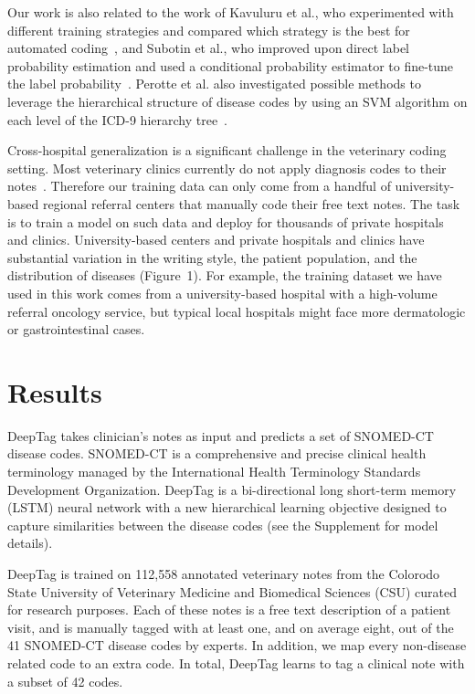 \documentclass{article}[11pt,oneside]
\begin{document}
Our work is also related to the work of Kavuluru et al., who experimented with different training strategies and compared which strategy is the best for automated coding~\cite{kavuluru2015empirical}, and Subotin et al., who improved upon direct label probability estimation and used a conditional probability estimator to fine-tune the label probability~\cite{subotin2016method}. Perotte et al. also investigated possible methods to leverage the hierarchical structure of disease codes by using an SVM algorithm on each level of the ICD-9 hierarchy tree~\cite{perotte2013diagnosis}.

Cross-hospital generalization is a significant challenge in the veterinary coding setting. Most veterinary clinics currently do not apply diagnosis codes to their notes~\cite{o2014approaches}. Therefore our training data can only come from a handful of university-based regional referral centers that manually code their free text notes. The task is to train a model on such data and deploy for thousands of private hospitals and clinics. University-based centers and private hospitals and clinics have substantial variation in the writing style, the patient population, and the distribution of diseases (Figure~1). For example, the training dataset we have used in this work comes from a university-based hospital with a high-volume referral oncology service, but typical local hospitals might face more dermatologic or gastrointestinal cases.

\section*{Results}

DeepTag takes clinician's notes as input and predicts a set of SNOMED-CT disease codes. SNOMED-CT is a comprehensive and precise clinical health terminology managed by the International Health Terminology Standards Development Organization. DeepTag is a bi-directional long short-term memory (LSTM) neural network with a new hierarchical learning objective designed to
capture similarities between the disease codes (see the Supplement for model details). 

DeepTag is trained on 112,558 annotated veterinary notes from the Colorodo State University of Veterinary Medicine and Biomedical Sciences (CSU) curated for research purposes. Each of these notes is a free text description of a patient visit, and is manually tagged with at least one, and on average eight, out of the 41 SNOMED-CT disease codes by experts. 
In addition, we map every non-disease related code to an extra  code. In total, DeepTag learns to tag a clinical note with a subset of 42 codes.
 
\end{document}
